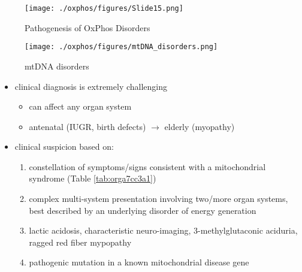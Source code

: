 \documentclass{scrartcl}
\begin{document}
\begin{figure}[htbp]
\centering
\texttt{[image: ./oxphos/figures/Slide15.png]}
\caption[ETC]{\label{fig:orgd4f1fc7}
Pathogenesis of OxPhos Disorders}
\end{figure}


\begin{figure}[htbp]
\centering
\texttt{[image: ./oxphos/figures/mtDNA\_disorders.png]}
\caption{\label{fig:orgd95a4e7}
mtDNA disorders}
\end{figure}

\begin{itemize}
\item clinical diagnosis is extremely challenging
\begin{itemize}
\item can affect any organ system
\item antenatal (IUGR, birth defects) \(\to\) elderly (myopathy)
\end{itemize}

\item clinical suspicion based on:
\begin{enumerate}
\item constellation of symptoms/signs consistent with a mitochondrial syndrome (Table \ref{tab:orga7cc3a1})
\item complex multi-system presentation involving two/more organ systems,
best described by an underlying disorder of energy generation
\item lactic acidosis, characteristic neuro-imaging, 3-methylglutaconic
aciduria, ragged red fiber mypopathy
\item pathogenic mutation in a known mitochondrial disease gene
\end{enumerate}
\end{itemize}
\end{document}
